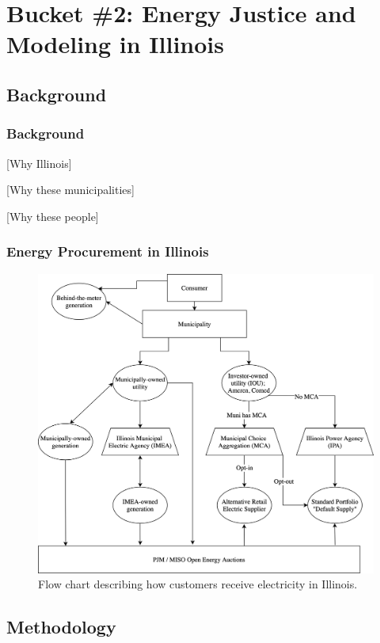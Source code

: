 \section{Bucket \#2: Energy Justice and Modeling in Illinois}

\subsection{Background}


\begin{frame}
    \frametitle{Background}
        
    [Why Illinois]

    [Why these municipalities]

    [Why these people]

\end{frame}


\begin{frame}
    \frametitle{Energy Procurement in Illinois}
    \begin{figure}
        \centering
        \includegraphics[height=0.75\textheight]{../docs/figures/07_interview_chapter/illinois-electric-choice.png}
        \caption{Flow chart describing how customers receive electricity in Illinois.}
        \label{fig:illinois-flow-chart}
    \end{figure}
\end{frame}

\subsection{Methodology}

